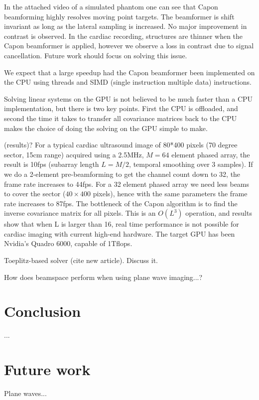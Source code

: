 \documentclass[12pt,journal,onecolumn]{IEEEtran}
\begin{document}
In the attached video of a simulated phantom one can see that Capon beamforming highly resolves moving point targets. The beamformer is shift invariant as long as the lateral sampling is increased. No major improvement in contrast is observed. In the cardiac recording, structures are thinner when the Capon beamformer is applied, however we observe a loss in contrast due to signal cancellation. Future work should focus on solving this issue.

We expect that a large speedup had the Capon beamformer been implemented on the CPU using threads and SIMD (single instruction multiple data) instructions. 

Solving linear systems on the GPU is not believed to be much faster than a CPU implementation, but there is two key points. First the CPU is offloaded, and second the time it takes to transfer all covariance matrices back to the CPU makes the choice of doing the solving on the GPU simple to make.

(results)?
For a typical cardiac ultrasound image of 80*400 pixels (70 degree sector, 15cm range) acquired using a 2.5MHz, $M=64$ element phased array, the result is 10fps (subarray length $L=M/2$, temporal smoothing over 3 samples). If we do a 2-element pre-beamforming to get the channel count down to 32, the frame rate increases to 44fps. For a 32 element phased array we need less beams to cover the sector ($40 \times 400$ pixels), hence with the same parameters the frame rate increases to 87fps. The bottleneck of the Capon algorithm is to find the inverse covariance matrix for all pixels. This is an $O(L^3)$ operation, and results show that when L is larger than 16, real time performance is not possible for cardiac imaging with current high-end hardware. The target GPU has been Nvidia’s Quadro 6000, capable of 1Tflops.

Toeplitz-based solver (cite new article). Discuss it.

How does beamspace perform when using plane wave imaging...?

\section{Conclusion}\label{sec:con}
...

\section{Future work}
Plane waves...
\end{document}
